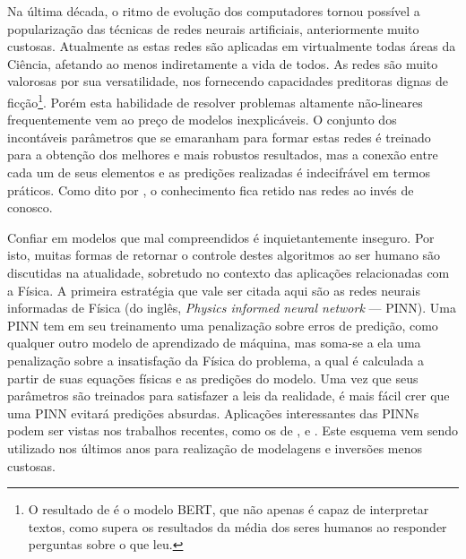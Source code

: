 

  Na última década, o ritmo de evolução dos computadores tornou possível a popularização das técnicas de redes neurais artificiais, anteriormente muito custosas. Atualmente as estas redes são aplicadas em virtualmente todas áreas da Ciência, afetando ao menos indiretamente a vida de todos. As redes são muito valorosas por sua versatilidade, nos fornecendo capacidades preditoras dignas de ficção\footnote{O resultado de  é o modelo BERT, que não apenas é capaz de interpretar textos, como supera os resultados da média dos seres humanos ao responder perguntas sobre o que leu.}. Porém esta habilidade de resolver problemas altamente não-lineares frequentemente vem ao preço de modelos \DIFaddbegin {}\DIFaddend inexplicáveis. O conjunto dos incontáveis parâmetros que se emaranham para formar estas redes é treinado para a obtenção dos melhores e mais robustos resultados, mas a conexão entre cada um de seus elementos e as predições realizadas é indecifrável em termos práticos. Como dito por , o conhecimento fica retido nas redes ao invés de conosco.

  Confiar em modelos que mal compreendidos é inquietantemente inseguro. Por isto, muitas formas de retornar o controle destes algoritmos ao ser humano são discutidas na atualidade, sobretudo no contexto das aplicações relacionadas com a Física. A primeira estratégia que vale ser citada aqui são as redes neurais informadas de Física (do inglês, \textit{Physics informed neural network} --- PINN). Uma PINN tem em seu treinamento uma penalização sobre erros de predição, como qualquer outro modelo de aprendizado de máquina, mas soma-se a ela uma penalização sobre a insatisfação da Física do problema, a qual é calculada a partir de suas equações físicas e as predições do modelo. Uma vez que seus parâmetros são treinados para satisfazer a leis da realidade, é mais fácil crer que uma PINN evitará predições absurdas. Aplicações interessantes das PINNs podem ser vistas nos trabalhos recentes, como os de ,  e . Este esquema vem sendo utilizado nos últimos anos para realização de modelagens e inversões menos custosas.

